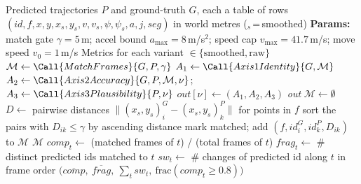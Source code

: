 \begin{algorithm}[ht]
\caption{\textsc{EvaluateTrajectoryQuality} --- three-axis scoring of world-coordinate trajectories}
\label{alg:trajquality}
\begin{algorithmic}[1]
\Require Predicted trajectories $P$ and ground-truth $G$, each a table of rows
\Statex \hspace{3.1em} $(\textit{id},f,x,y,x_s,y_s,v,v_s,\psi,\psi_s,a,j,\textit{seg})$ in world metres ($_s$\,=\,smoothed)
\Statex \textbf{Params:} match gate $\gamma{=}5$\,m; accel bound $a_{\max}{=}8$\,m/s$^2$; speed cap $v_{\max}{=}41.7$\,m/s; move speed $v_0{=}1$\,m/s
\Ensure Metrics for each variant $\in\{\text{smoothed},\text{raw}\}$
\Statex
\State $\mathcal{M} \gets \Call{MatchFrames}{G,P,\gamma}$ 
\State $A_1 \gets \Call{Axis1Identity}{G,\mathcal{M}}$ 
  \State $A_2 \gets \Call{Axis2Accuracy}{G,P,\mathcal{M},\nu}$;\quad $A_3 \gets \Call{Axis3Plausibility}{P,\nu}$
  \State $\textit{out}[\nu] \gets (A_1, A_2, A_3)$
\EndFor
\State \Return \textit{out}
\Statex
{} 
  \State $\mathcal{M} \gets \emptyset$
    \State $D \gets$ pairwise distances $\lVert (x_s,y_s)^G_i - (x_s,y_s)^P_k \rVert$ for points in $f$
    \State sort the pairs with $D_{ik}\le\gamma$ by ascending distance
       mark matched; add $(f,\textit{id}^G_i,\textit{id}^P_k,D_{ik})$ to $\mathcal{M}$ \EndIf
    \EndFor
  \EndFor
  \State \Return $\mathcal{M}$
\EndProcedure
\Statex
{} 
    \State $\textit{comp}_t \gets$ (matched frames of $t$) / (total frames of $t$)
    \State $\textit{frag}_t \gets$ \# distinct predicted ids matched to $t$ 
    \State $\textit{sw}_t \gets$ \# changes of predicted id along $t$ in frame order
  \EndFor
  \State \Return $\big(\overline{\textit{comp}},\ \overline{\textit{frag}},\ \textstyle\sum_t \textit{sw}_t,\ \text{frac}(\textit{comp}_t\!\ge\!0.8)\big)$
\EndProcedure
\Statex
{} 

\end{algorithmic}
\end{algorithm}

